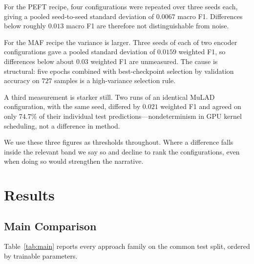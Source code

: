 \documentclass[conference]{IEEEtran}
\begin{document}
For the PEFT recipe, four configurations were repeated over three seeds each,
giving a pooled seed-to-seed standard deviation of $0.0067$ macro F1.
Differences below roughly $0.013$ macro F1 are therefore not distinguishable
from noise.

For the MAF recipe the variance is larger. Three seeds of each of two encoder
configurations gave a pooled standard deviation of $0.0159$ weighted F1, so
differences below about $0.03$ weighted F1 are unmeasured. The cause is
structural: five epochs combined with best-checkpoint selection by validation
accuracy on $727$ samples is a high-variance selection rule.

A third measurement is starker still. Two runs of an identical MuLAD
configuration, with the same seed, differed by $0.021$ weighted F1 and agreed on
only $74.7\%$ of their individual test predictions---nondeterminism in GPU
kernel scheduling, not a difference in method.

We use these three figures as thresholds throughout. Where a difference falls
inside the relevant band we say so and decline to rank the configurations, even
when doing so would strengthen the narrative.

\section{Results}
\label{sec:results}

\subsection{Main Comparison}

Table~\ref{tab:main} reports every approach family on the common test split,
ordered by trainable parameters.
\end{document}

